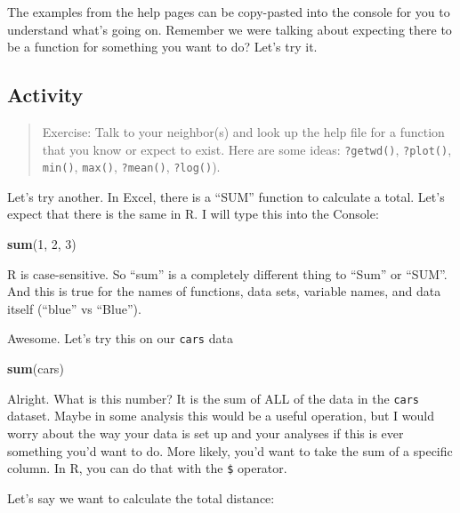 \documentclass[]{book}
\newenvironment{Shaded}{\begin{snugshade}}{\end{snugshade}}
\newcommand{\DecValTok}[1]{\textcolor[rgb]{0.00,0.00,0.81}{#1}}
\newcommand{\KeywordTok}[1]{\textcolor[rgb]{0.13,0.29,0.53}{\textbf{#1}}}
\newcommand{\NormalTok}[1]{#1}
\begin{document}
The examples from the help pages can be copy-pasted into the console for you to understand what's going on. Remember we were talking about expecting there to be a function for something you want to do? Let's try it.

\hypertarget{activity}{%
\subsection{Activity}\label{activity}}

\begin{quote}
Exercise: Talk to your neighbor(s) and look up the help file for a function that you know or expect to exist. Here are some ideas: \texttt{?getwd()}, \texttt{?plot()}, \texttt{min()}, \texttt{max()}, \texttt{?mean()}, \texttt{?log()}).
\end{quote}

Let's try another. In Excel, there is a ``SUM'' function to calculate a total. Let's expect that there is the same in R. I will type this into the Console:

\begin{Shaded}
\begin{Highlighting}[]
\KeywordTok{sum}\NormalTok{(}\DecValTok{1}\NormalTok{, }\DecValTok{2}\NormalTok{, }\DecValTok{3}\NormalTok{)}
\end{Highlighting}
\end{Shaded}

R is case-sensitive. So ``sum'' is a completely different thing to ``Sum'' or ``SUM''. And this is true for the names of functions, data sets, variable names, and data itself (``blue'' vs ``Blue'').

Awesome. Let's try this on our \texttt{cars} data

\begin{Shaded}
\begin{Highlighting}[]
\KeywordTok{sum}\NormalTok{(cars)}
\end{Highlighting}
\end{Shaded}

Alright. What is this number? It is the sum of ALL of the data in the \texttt{cars} dataset. Maybe in some analysis this would be a useful operation, but I would worry about the way your data is set up and your analyses if this is ever something you'd want to do. More likely, you'd want to take the sum of a specific column. In R, you can do that with the \texttt{\$} operator.

Let's say we want to calculate the total distance:
\end{document}
